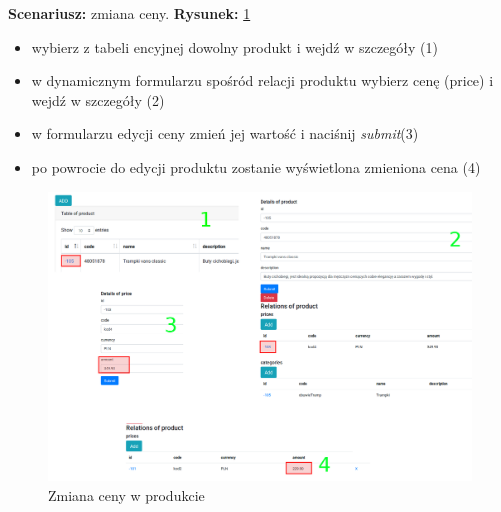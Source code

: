 \noindent
\textbf{Scenariusz: } zmiana ceny. \textbf{Rysunek: } \ref{zmianacenyproduktu} 
\begin{itemize}
	\item wybierz z tabeli encyjnej dowolny produkt i wejdź w szczegóły (1)
	\item w dynamicznym formularzu spośród relacji produktu wybierz cenę (price) i wejdź w szczegóły (2) 
	\item w formularzu edycji ceny zmień jej wartość i naciśnij \textit{submit}(3)
	\item po powrocie do edycji produktu zostanie wyświetlona zmieniona cena (4)
\end{itemize}
\begin{figure}
	\begin{center}
		\includegraphics[scale=1.2]{zmianacenyproduktu.png}
	\end{center}
	\caption{{\color{black}Zmiana ceny w produkcie}} \label{zmianacenyproduktu}
\end{figure}

